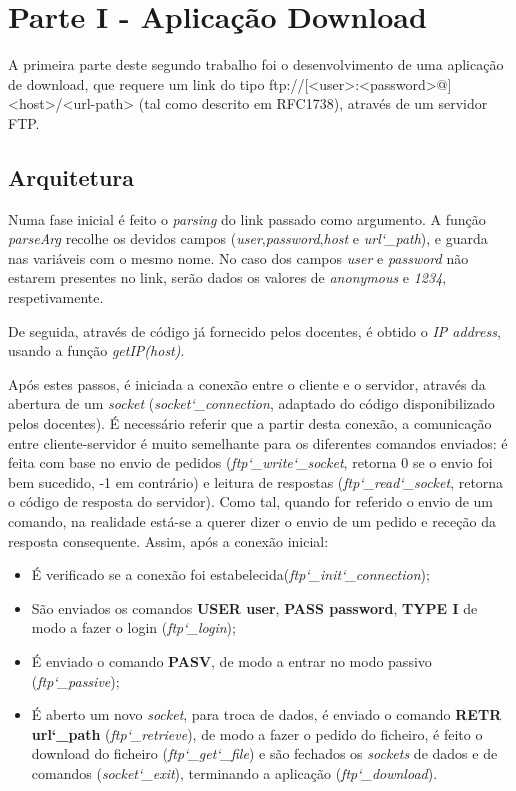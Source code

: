 \section*{Parte I - Aplicação Download}
A primeira parte deste segundo trabalho foi o desenvolvimento de uma aplicação de download, que requere
um link do tipo ftp://[<user>:<password>@]<host>/<url-path> (tal como descrito em RFC1738), através de um servidor FTP.

\subsection*{Arquitetura}
Numa fase inicial é feito o \textit{parsing} do link passado como argumento.
A função \textit{parseArg} recolhe os devidos campos (\textit{user},\textit{password},\textit{host} e \textit{url\char`_path}), e guarda nas variáveis com o mesmo nome.
No caso dos campos \textit{user} e \textit{password} não estarem presentes no link, serão dados os valores de \textit{anonymous} e \textit{1234}, respetivamente.

De seguida, através de código já fornecido pelos docentes, é obtido o \textit{IP address}, usando a função \textit{getIP(host)}.

Após estes passos, é iniciada a conexão entre o cliente e o servidor, através da abertura de um \textit{socket} (\textit{socket\char`_connection}, adaptado do código disponibilizado pelos docentes).
É necessário referir que a partir desta conexão, a comunicação entre cliente-servidor é muito semelhante para os diferentes comandos enviados: é feita com base no envio de pedidos (\textit{ftp\char`_write\char`_socket}, retorna 0 se o envio foi bem sucedido, -1 em contrário) e leitura de respostas (\textit{ftp\char`_read\char`_socket}, retorna o código de resposta do servidor). Como tal, quando for referido o envio de um comando, na realidade está-se a querer dizer o envio de um pedido e receção da resposta consequente.
Assim, após a conexão inicial:
\begin{itemize}
\item É verificado se a conexão foi estabelecida(\textit{ftp\char`_init\char`_connection});
\item São enviados os comandos \textbf{USER user}, \textbf{PASS password}, \textbf{TYPE I} de modo a fazer o login (\textit{ftp\char`_login});
\item É enviado o comando \textbf{PASV}, de modo a entrar no modo passivo (\textit{ftp\char`_passive});
\item É aberto um novo \textit{socket}, para troca de dados, é enviado o comando \textbf{RETR url\char`_path} (\textit{ftp\char`_retrieve}), de modo a fazer o pedido do ficheiro, é feito o download do ficheiro (\textit{ftp\char`_get\char`_file}) e são fechados os \textit{sockets} de dados e de comandos (\textit{socket\char`_exit}), terminando a aplicação (\textit{ftp\char`_download}).
\end{itemize}
